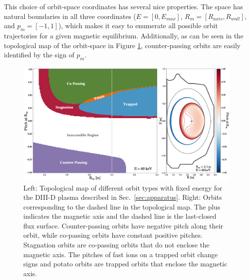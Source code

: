 This choice of orbit-space coordinates has several nice properties. The space has natural boundaries in all three coordinates ($E = [0,E_{max}]$, $R_m = [R_{axis},R_{wall}]$, and $p_m = [-1,1]$), which makes it easy to enumerate all possible orbit trajectories for a given magnetic equilibrium.
Additionally, as can be seen in the topological map of the orbit-space in Figure \ref{fig:orbit_topology}, counter-passing orbits are easily identified by the sign of $p_m$.
\begin{figure}[ht]
    \centering
    \includegraphics[width=15cm]{figures/orbit_topology3.eps}
    \caption{Left: Topological map of different orbit types \cite{WHITE} with fixed energy
for the DIII-D plasma described in Sec.~\ref{sec:apparatus}.
 \newline Right: Orbits corresponding to the dashed line in the topological map. The
plus indicates the magnetic axis and the dashed line is the last-closed flux surface. Counter-passing orbits have negative pitch along their orbit, while co-passing orbits have constant positive pitches. Stagnation orbits are co-passing orbits that do not enclose the magnetic axis. The pitches of fast ions on a trapped orbit change signs and potato orbits are trapped orbits that enclose the magnetic axis.}
    \label{fig:orbit_topology}
\end{figure}

